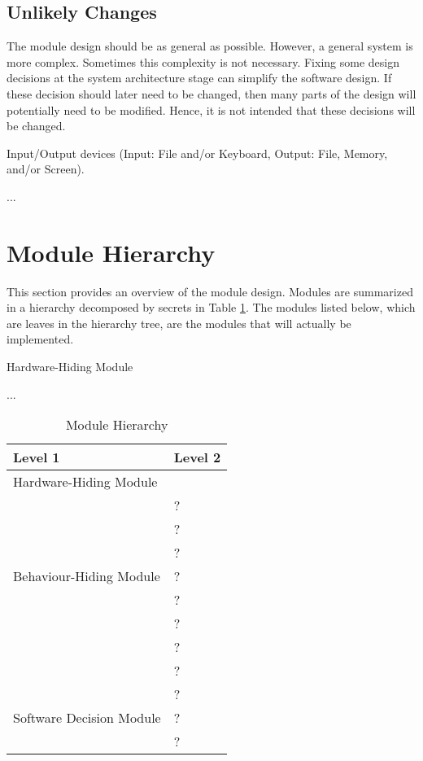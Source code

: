 \documentclass[12pt, titlepage]{article}
\newcounter{ucnum}
\newcommand{\uctheucnum}{UC\theucnum}
\newcounter{mnum}
\newcommand{\mthemnum}{M\themnum}
\begin{document}
\subsection{Unlikely Changes} \label{SecUchange}

The module design should be as general as possible. However, a general system is
more complex. Sometimes this complexity is not necessary. Fixing some design
decisions at the system architecture stage can simplify the software design. If
these decision should later need to be changed, then many parts of the design
will potentially need to be modified. Hence, it is not intended that these
decisions will be changed.

\begin{description}
  \item[ \uctheucnum \label{ucIO}:] Input/Output devices
    (Input: File and/or Keyboard, Output: File, Memory, and/or Screen).
  \item ...
\end{description}

\section{Module Hierarchy} \label{SecMH}

This section provides an overview of the module design. Modules are summarized
in a hierarchy decomposed by secrets in Table \ref{TblMH}. The modules listed
below, which are leaves in the hierarchy tree, are the modules that will
actually be implemented.

\begin{description}
  \item [ \mthemnum \label{mHH}:] Hardware-Hiding Module
  \item ...
\end{description}

\begin{table}[h!]
  \centering
  \begin{tabular}{p{} p{}}
    \toprule
    \textbf{Level 1} & \textbf{Level 2}\\
    \midrule

    {Hardware-Hiding Module} & ~ \\
    \midrule

    \multirow{7}{0.3\textwidth}{Behaviour-Hiding Module} & ?\\
    & ?\\
    & ?\\
    & ?\\
    & ?\\
    & ?\\
    & ?\\
    & ?\\
    \midrule

    \multirow{3}{0.3\textwidth}{Software Decision Module} & {?}\\
    & ?\\
    & ?\\
    \bottomrule

  \end{tabular}
  \caption{Module Hierarchy}
  \label{TblMH}
\end{table}
\end{document}
